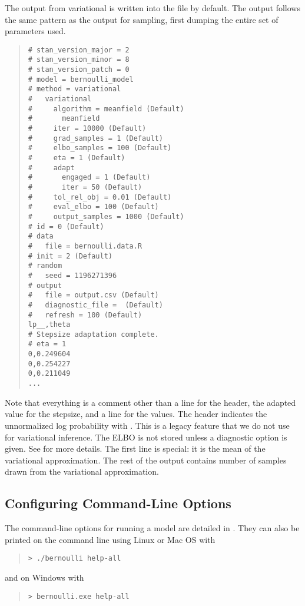 The output from variational is written into the file
 by default.  The output follows the same pattern as the
output for sampling, first dumping the entire set of parameters used.
%
\begin{quote}
\begin{Verbatim}[fontsize=\small]
# stan_version_major = 2
# stan_version_minor = 8
# stan_version_patch = 0
# model = bernoulli_model
# method = variational
#   variational
#     algorithm = meanfield (Default)
#       meanfield
#     iter = 10000 (Default)
#     grad_samples = 1 (Default)
#     elbo_samples = 100 (Default)
#     eta = 1 (Default)
#     adapt
#       engaged = 1 (Default)
#       iter = 50 (Default)
#     tol_rel_obj = 0.01 (Default)
#     eval_elbo = 100 (Default)
#     output_samples = 1000 (Default)
# id = 0 (Default)
# data
#   file = bernoulli.data.R
# init = 2 (Default)
# random
#   seed = 1196271396
# output
#   file = output.csv (Default)
#   diagnostic_file =  (Default)
#   refresh = 100 (Default)
lp__,theta
# Stepsize adaptation complete.
# eta = 1
0,0.249604
0,0.254227
0,0.211049
...
\end{Verbatim}
\end{quote}
%
Note that everything is a comment other than a line for the header, the adapted
value for the stepsize, and a line for the values. The header indicates the
unnormalized log probability with . This is a legacy feature that
we do not use for variational inference. The ELBO is not stored unless a
diagnostic option is given. See  for more
details.
The first line is special: it is the mean of the variational approximation.
The rest of the output contains  number of samples
drawn from the variational approximation.

\subsection{Configuring Command-Line Options}

The command-line options for running a model are detailed in
. They can also be printed on the command line
using Linux or Mac OS with
%
\begin{quote}
\begin{Verbatim}[fontshape=sl]
> ./bernoulli help-all
\end{Verbatim}
\end{quote}
%
and on Windows with
%
\begin{quote}
\begin{Verbatim}[fontshape=sl]
> bernoulli.exe help-all
\end{Verbatim}
\end{quote}
%
